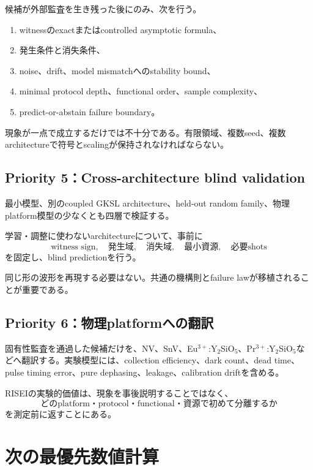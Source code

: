 \documentclass[11pt,a4paper,uplatex,dvipdfmx]{bxjsarticle}
\theoremstyle{remark}
\begin{document}
候補が外部監査を生き残った後にのみ、次を行う。

\begin{enumerate}
  \item witnessのexactまたはcontrolled asymptotic formula、
  \item 発生条件と消失条件、
  \item noise、drift、model mismatchへのstability bound、
  \item minimal protocol depth、functional order、sample complexity、
  \item predict-or-abstain failure boundary。
\end{enumerate}

現象が一点で成立するだけでは不十分である。有限領域、複数seed、複数architectureで符号とscalingが保持されなければならない。

\subsection{Priority 5：Cross-architecture blind validation}

最小模型、別のcoupled GKSL architecture、held-out random family、物理platform模型の少なくとも四層で検証する。

学習・調整に使わないarchitectureについて、事前に
\begin{equation}
\text{witness sign},\quad
\text{発生域},\quad
\text{消失域},\quad
\text{最小資源},\quad
\text{必要shots}
\end{equation}
を固定し、blind predictionを行う。

同じ形の波形を再現する必要はない。共通の機構則とfailure lawが移植されることが重要である。

\subsection{Priority 6：物理platformへの翻訳}

固有性監査を通過した候補だけを、NV、SnV、Eu$^{3+}$:Y$_2$SiO$_5$、Pr$^{3+}$:Y$_2$SiO$_5$などへ翻訳する。実験模型には、collection efficiency、dark count、dead time、pulse timing error、pure dephasing、leakage、calibration driftを含める。

RISEIの実験的価値は、現象を事後説明することではなく、
\begin{equation}
\boxed{
\text{どのplatform・protocol・functional・資源で初めて分離するか}
}
\end{equation}
を測定前に返すことにある。

\section{次の最優先数値計算}
\end{document}
